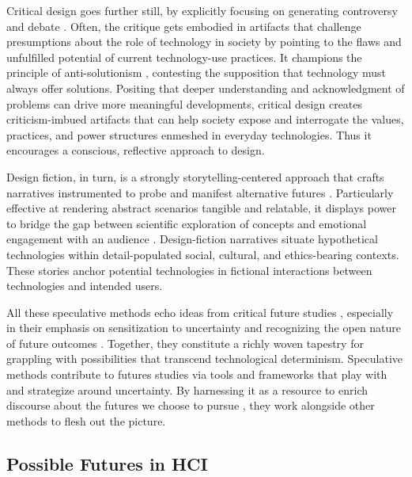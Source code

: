Critical design goes further still, by explicitly focusing on generating controversy and debate \cite{bardzell_critical_2012, bardzell_reading_2014, bardzell_what_2013}. Often, the critique gets embodied in artifacts that challenge presumptions about the role of technology in society by pointing to the flaws and unfulfilled potential of current technology-use practices. It champions the principle of anti-solutionism \cite{blythe_anti-solutionist_2016}, contesting the supposition that technology must always offer solutions. Positing that deeper understanding and acknowledgment of problems can drive more meaningful developments, critical design creates criticism-imbued artifacts that can help society expose and interrogate the values, practices, and power structures enmeshed in everyday technologies. Thus it encourages a conscious, reflective approach to design.

Design fiction, in turn, is a strongly storytelling-centered approach that crafts narratives instrumented to probe and manifest alternative futures \cite{bleecker_design_2009, sterling_design_2009, tanenbaum_design_2014}. Particularly effective at rendering abstract scenarios tangible and relatable, it displays power to bridge the gap between scientific exploration of concepts and emotional engagement with an audience \cite{coulton2017design}. Design-fiction narratives situate hypothetical technologies within detail-populated social, cultural, and ethics-bearing contexts. These stories anchor potential technologies in fictional interactions between technologies and intended users. 

All these speculative methods echo ideas from critical future studies \cite{slaughterKnowledgeBaseFutures1998}, especially in their emphasis on sensitization to uncertainty 
and recognizing 
the open nature of future outcomes \cite{howell2021calling, poli_anticipation_2019, gallHowVisualiseFutures2022}. Together, they constitute a richly woven tapestry for grappling with possibilities that transcend technological determinism. Speculative methods contribute to futures studies via tools and frameworks that play with and strategize around uncertainty. By harnessing it as a resource to enrich discourse about the futures we choose to pursue \cite{epp_uncertainties_2024}, they work alongside other methods to flesh out the picture. 

\subsection{Possible Futures in HCI} \label{sec:possible-futures-HCI}

